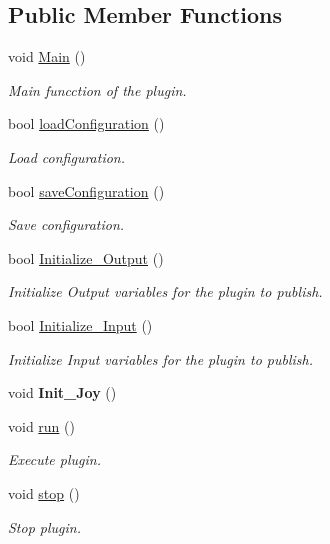 \subsection*{Public Member Functions}
\begin{DoxyCompactItemize}
\item 
void \hyperlink{class_joystick___writer_aeb9c03f2389a5ed060b9c2a46fb84316}{Main} ()
\begin{DoxyCompactList}\small\item\em Main funcction of the plugin. \end{DoxyCompactList}\item 
bool \hyperlink{class_joystick___writer_a8c8c94397bbbb2058685ad6e0f92b4b1}{load\+Configuration} ()
\begin{DoxyCompactList}\small\item\em Load configuration. \end{DoxyCompactList}\item 
bool \hyperlink{class_joystick___writer_a67a56e0ae63ad59657f4745dcac2f7a3}{save\+Configuration} ()
\begin{DoxyCompactList}\small\item\em Save configuration. \end{DoxyCompactList}\item 
bool \hyperlink{class_joystick___writer_a3b341bb82658ee52172b22d90a18628f}{Initialize\+\_\+\+Output} ()
\begin{DoxyCompactList}\small\item\em Initialize Output variables for the plugin to publish. \end{DoxyCompactList}\item 
bool \hyperlink{class_joystick___writer_a4f7355cdbd819e5ce41575e152c98660}{Initialize\+\_\+\+Input} ()
\begin{DoxyCompactList}\small\item\em Initialize Input variables for the plugin to publish. \end{DoxyCompactList}\item 
\mbox{\label{class_joystick___writer_a4bf2e08d435de90408c97e32dce88c45}} 
void {\bfseries Init\+\_\+\+Joy} ()
\item 
void \hyperlink{class_joystick___writer_aa1ab2778180c281887758883622b78bf}{run} ()
\begin{DoxyCompactList}\small\item\em Execute plugin. \end{DoxyCompactList}\item 
void \hyperlink{class_joystick___writer_a3c606f3961eea4b6a371146479ca26da}{stop} ()
\begin{DoxyCompactList}\small\item\em Stop plugin. \end{DoxyCompactList}\end{DoxyCompactItemize}
